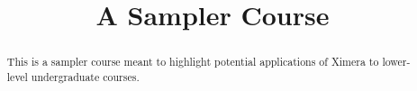 \documentclass{xourse}
\title{A Sampler Course}%
\begin{document}
      
\begin{abstract} %
This is a sampler course meant to highlight potential applications of Ximera to lower-level undergraduate courses.      
\end{abstract}
      
\maketitle
      

      

      


      
\end{document}
